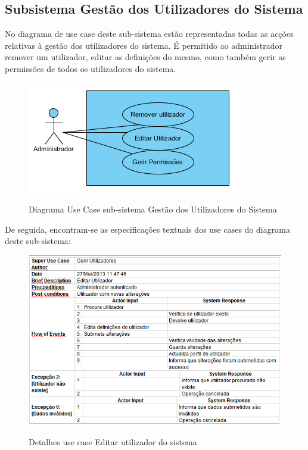 ﻿\documentclass[12pt,a4paper]{article}
\begin{document}
\clearpage

\subsection{Subsistema Gestão dos Utilizadores do Sistema}
No diagrama de use case deste sub-sistema estão representadas todas as acções relativas
à gestão dos utilizadores do sistema. É permitido ao administrador remover um utilizador, editar as definições do mesmo, como também gerir as permissões de todos os utilizadores do sistema. \\

\begin{figure}[h!]
\centering
\includegraphics[scale=1]{usecase/A_GerirUtilizadores}
\label{usecase}
\caption{Diagrama Use Case sub-sistema Gestão dos Utilizadores do Sistema}
\end{figure}

De seguida, encontram-se as especificações textuais dos use cases do diagrama deste sub-sistema:\\

\begin{figure}[h!]
\centering
\includegraphics[scale=0.7]{d_usecase/A_editarutilizador}
\label{usecase}
\caption{Detalhes use case Editar utilizador do sistema}
\end{figure}
\end{document}

